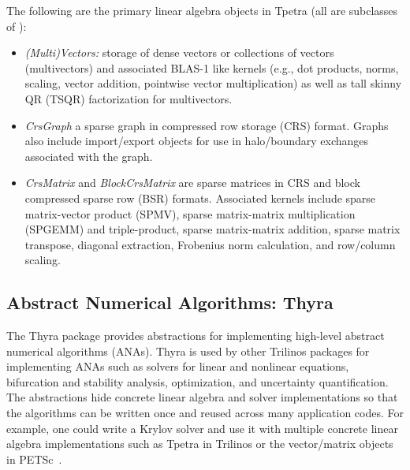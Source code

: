 The following are the primary linear algebra objects in Tpetra (all are subclasses of ):
\begin{itemize}
\item \emph{(Multi)Vectors:} storage of dense vectors or collections of
vectors (multivectors) and associated BLAS-1 like kernels (e.g., dot
products, norms, scaling, vector addition, pointwise vector
multiplication) as well as tall skinny QR (TSQR) factorization for multivectors.
\item \emph{CrsGraph} a sparse graph in compressed row storage (CRS)
format. Graphs also include import/export objects for use in
halo/boundary exchanges associated with the graph.
\item \emph{CrsMatrix} and \emph{BlockCrsMatrix} are sparse matrices in CRS and
block compressed sparse row (BSR) formats. Associated kernels include
sparse matrix-vector product (SPMV), sparse matrix-matrix
multiplication (SPGEMM) and triple-product, sparse matrix-matrix addition, sparse matrix transpose, diagonal extraction,
Frobenius norm calculation, and row/column scaling.
\end{itemize}

\subsection{Abstract Numerical Algorithms: Thyra}
The Thyra package provides abstractions for implementing high-level abstract numerical algorithms (ANAs). Thyra is used by other Trilinos packages for implementing ANAs such as solvers for linear and nonlinear equations, bifurcation and stability analysis, optimization, and uncertainty quantification. The abstractions hide concrete linear algebra and solver implementations so that the algorithms can be written once and reused across many application codes. For example, one could write a Krylov solver and use it with multiple concrete linear algebra implementations such as Tpetra in Trilinos %
or the vector/matrix objects in PETSc~\cite{petsc-web-page}.

